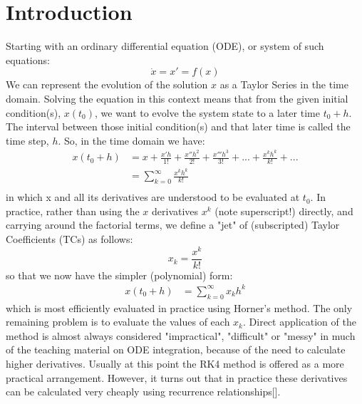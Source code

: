 \documentclass[11pt]{article}
\begin{document}
\section{Introduction}
Starting with an ordinary differential equation (ODE), or system of such equations:
\begin{equation}
\dot{x} = x' = f(x)
\end{equation}
We can represent the evolution of the solution $x$ as a Taylor Series in the time domain.
Solving the equation in this context means that from the given initial condition(s), $x(t_0)$, we want to evolve the system state to a later time $t_0 + h$.
The interval between those initial condition(s) and that later time is called the time step, $h$.
So, in the time domain we have:
\begin{equation}
\begin{aligned}
x(t_0+h) &= x + \frac{x'h}{1!} + \frac{x''h^2}{2!} + \frac{x'''h^3}{3!} + ... + \frac{x^kh^k}{k!} + ...\\
&= \sum_{k=0}^{\infty} \frac{x^kh^k}{k!}\\
\end{aligned}
\end{equation}
in which x and all its derivatives are understood to be evaluated at $t_0$.
In practice, rather than using the $x$ derivatives $x^k$ (note superscript!) directly, and carrying around the factorial terms, we define a "jet" of (subscripted) Taylor Coefficients (TCs) as follows:
\begin{equation}
x_k = \frac{x^k}{k!}
\end{equation}
so that we now have the simpler (polynomial) form:
\begin{equation}
\begin{aligned}
x(t_0+h) &= \sum_{k=0}^{\infty} x_kh^k
\end{aligned}
\end{equation}
which is most efficiently evaluated in practice using Horner's method.
The only remaining problem is to evaluate the values of each $x_k$.
Direct application of the method is almost always considered "impractical", "difficult" or "messy" in much of the teaching material on ODE integration, because of the need to calculate higher derivatives.
Usually at this point the RK4 method is offered as a more practical arrangement.
However, it turns out that in practice these derivatives can be calculated very cheaply using recurrence relationships[].
\end{document}
